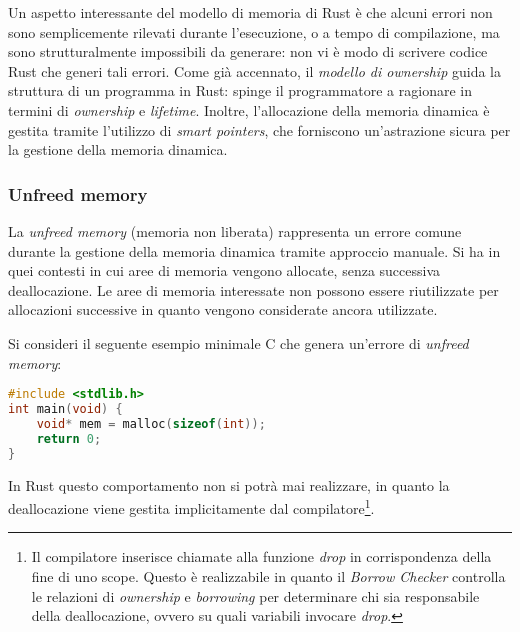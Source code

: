 Un aspetto interessante del modello di memoria di Rust è che alcuni errori non sono semplicemente rilevati
durante l'esecuzione, o a tempo di compilazione, ma sono strutturalmente impossibili da generare: non vi è modo di scrivere codice Rust che generi tali errori.
Come già accennato, il \textit{modello di ownership} guida la struttura di un programma in Rust: spinge il programmatore a
ragionare in termini di \textit{ownership} e \textit{lifetime}. Inoltre, l'allocazione della memoria dinamica è gestita tramite l'utilizzo
di \textit{smart pointers}, che forniscono un'astrazione sicura per la gestione della memoria dinamica.

\subsubsection{Unfreed memory}
La \textit{unfreed memory} (memoria non liberata) rappresenta un errore comune durante la gestione della memoria dinamica tramite approccio manuale.
Si ha in quei contesti in cui aree di memoria vengono allocate, senza successiva deallocazione. Le aree di memoria interessate non
possono essere riutilizzate per allocazioni successive in quanto vengono considerate ancora utilizzate.

Si consideri il seguente esempio minimale C che genera un'errore di \textit{unfreed memory}:
\begin{lstlisting}[language=C, caption={Unfreed memory in C}, label={c:unfreed-memory}]
#include <stdlib.h>
int main(void) {
    void* mem = malloc(sizeof(int));
    return 0;
}
\end{lstlisting}
In Rust questo comportamento non si potrà mai realizzare, in quanto la deallocazione viene gestita implicitamente dal compilatore\footnote{Il compilatore inserisce chiamate alla funzione \textit{drop} in corrispondenza della fine di uno scope. Questo è realizzabile in quanto il \textit{Borrow Checker} controlla le relazioni di \textit{ownership} e \textit{borrowing} per determinare chi sia responsabile della deallocazione, ovvero su quali variabili invocare \textit{drop}.}. \hfill

